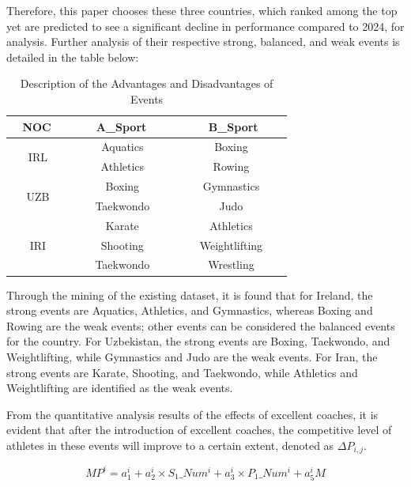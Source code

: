 \documentclass{mcmthesis}
\begin{document}
Therefore, this paper chooses these three countries, which ranked among the top yet are predicted to see a significant decline in performance compared to 2024, for analysis. Further analysis of their respective strong, balanced, and weak events is detailed in the table below:

\begin{table}
\centering
\caption{Description of the Advantages and Disadvantages of Events}
\begin{tabular}{|c|c|c|} 
\hline
\textbf{~ NOC~~}     & \textbf{~ ~ A\_Sport~ ~~} & \textbf{~ ~ ~B\_Sport~ ~~}  \\ 
\hline
\multirow{2}{*}{IRL} & Aquatics                  & Boxing                      \\ 
\cline{2-3}
                     & Athletics                 & Rowing                      \\ 
\hline
\multirow{2}{*}{UZB} & Boxing                    & Gymnastics                  \\ 
\cline{2-3}
                     & Taekwondo                 & Judo                        \\ 
\hline
\multirow{3}{*}{IRI} & Karate                    & Athletics                   \\ 
\cline{2-3}
                     & Shooting                  & Weightlifting               \\ 
\cline{2-3}
                     & Taekwondo                 & Wrestling                   \\
\hline
\end{tabular}
\end{table}

Through the mining of the existing dataset, it is found that for Ireland, the strong events are Aquatics, Athletics, and Gymnastics, whereas Boxing and Rowing are the weak events; other events can be considered the balanced events for the country. For Uzbekistan, the strong events are Boxing, Taekwondo, and Weightlifting, while Gymnastics and Judo are the weak events. For Iran, the strong events are Karate, Shooting, and Taekwondo, while Athletics and Weightlifting are identified as the weak events.

From the quantitative analysis results of the effects of excellent coaches, it is evident that after the introduction of excellent coaches, the competitive level of athletes in these events will improve to a certain extent, denoted as $\Delta P_{i, j}$.

\begin{equation}
MP^{i} = a_{1} ^ {i} + a_{2} ^{i}\times S_{1}\_Num^{i} + a_{3}^{i}\times P_{1}\_Num^{i} + a_{5}^{i}M
\end{equation}
\end{document}
